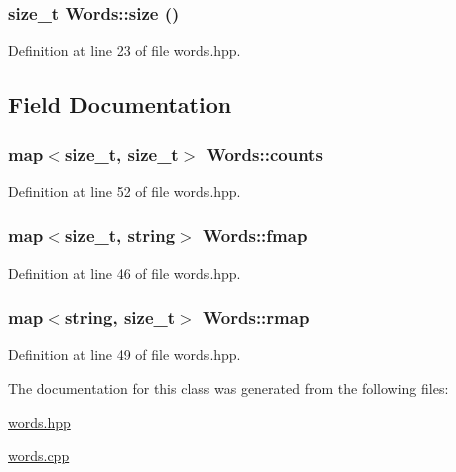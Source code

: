 \hypertarget{class_words_a706c072736f1129d0a13f47d94614ff3}{
\subsubsection[{size}]{\setlength{\rightskip}{0pt plus 5cm}size\_\-t Words::size ()}}
\label{class_words_a706c072736f1129d0a13f47d94614ff3}


Definition at line 23 of file words.hpp.



\subsection{Field Documentation}
\hypertarget{class_words_aa40f09ffa14222f1c174915e506c175a}{
\subsubsection[{counts}]{\setlength{\rightskip}{0pt plus 5cm}map$<$size\_\-t, size\_\-t$>$ {\bf Words::counts}}}
\label{class_words_aa40f09ffa14222f1c174915e506c175a}


Definition at line 52 of file words.hpp.

\hypertarget{class_words_a5ee8f73254e0c6df23e2ceca6a1c9fab}{
\subsubsection[{fmap}]{\setlength{\rightskip}{0pt plus 5cm}map$<$size\_\-t, string$>$ {\bf Words::fmap}}}
\label{class_words_a5ee8f73254e0c6df23e2ceca6a1c9fab}


Definition at line 46 of file words.hpp.

\hypertarget{class_words_ace9dafad0716c11b073bd3b306ff1316}{
\subsubsection[{rmap}]{\setlength{\rightskip}{0pt plus 5cm}map$<$string, size\_\-t$>$ {\bf Words::rmap}}}
\label{class_words_ace9dafad0716c11b073bd3b306ff1316}


Definition at line 49 of file words.hpp.



The documentation for this class was generated from the following files:\begin{DoxyCompactItemize}
\item 
\hyperlink{words_8hpp}{words.hpp}\item 
\hyperlink{words_8cpp}{words.cpp}\end{DoxyCompactItemize}

